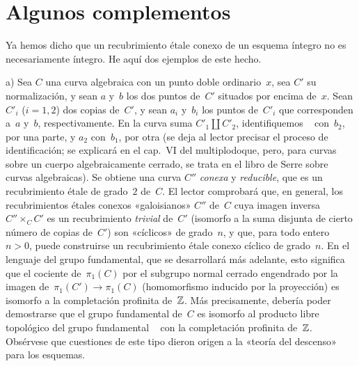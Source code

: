 \section{Algunos complementos}
\label{I.11}

Ya hemos dicho que un recubrimiento étale conexo de un esquema íntegro no es necesariamente íntegro. He aquí dos ejemplos de este hecho.

\noindent
a) Sea $C$ una curva algebraica con un punto doble ordinario~$x$, sea $C'$ su normalización, y sean $a$ y~$b$ los dos puntos de~$C'$ situados por encima de~$x$. Sean $C'_i$ ($i=1,2$) dos copias de~$C'$, y sean $a_i$ y~$b_i$ los puntos de~$C'_i$ que corresponden a~$a$ y~$b$, respectivamente. En la curva suma $C'_1\amalg C'_2$, identifiquemos
\ %
con~$b_2$, por una parte, y $a_2$ con~$b_1$, por otra (se deja al lector precisar el proceso de identificación; se explicará en el cap.~VI del multiplodoque, pero, para curvas sobre un cuerpo algebraicamente cerrado, se trata en el libro de Serre sobre curvas algebraicas). Se obtiene una curva $C''$ \emph{conexa} y \emph{reducible}, que es un recubrimiento étale de grado~$2$ de~$C$. El lector comprobará que, en general, los recubrimientos étales conexos «galoisianos» $C''$ de~$C$ cuya imagen inversa $C''\times_CC'$ es un recubrimiento \emph{trivial} de~$C'$ (\ie isomorfo a la suma disjunta de cierto número de copias de~$C'$) son «cíclicos» de grado~$n$, y que, para todo entero $n>0$, puede construirse un recubrimiento étale conexo cíclico de grado~$n$. En el lenguaje del grupo fundamental, que se desarrollará más adelante, esto significa que el cociente de~$\pi_1(C)$ por el subgrupo normal cerrado engendrado por la imagen de~$\pi_1(C')\to\pi_1(C)$ (homomorfismo inducido por la proyección) es isomorfo a la completación profinita de~$\mathbb Z$. Más precisamente, debería poder demostrarse que el grupo fundamental de~$C$ es isomorfo al producto libre topológico del grupo fundamental
\ %
con la completación profinita de~$\mathbb Z$. Obsérvese que cuestiones de este tipo dieron origen a la «teoría del descenso» para los esquemas.

